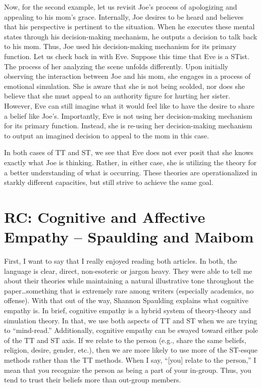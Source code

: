 \documentclass[11pt]{article}
\begin{document}
Now, for the second example, let us revisit Joe's process of apologizing and appealing to his mom's grace. Internally, Joe desires to be heard and believes that his perspective is pertinent to the situation. When he executes these mental states through his decision-making mechanism, he outputs a decision to talk back to his mom. Thus, Joe used his decision-making mechanism for its primary function. Let us check back in with Eve. Suppose this time that Eve is a STist. The process of her analyzing the scene unfolds differently. Upon initially observing the interaction between Joe and his mom, she engages in a process of emotional simulation. She is aware that she is not being scolded, nor does she believe that she must appeal to an authority figure for hurting her sister. However, Eve can still imagine what it would feel like to have the desire to share a belief like Joe's. Importantly, Eve is not using her decision-making mechanism for its primary function. Instead, she is re-using her decision-making mechanism to output an imagined decision to appeal to the mom in this case.

In both cases of TT and ST, we see that Eve does not ever posit that she knows exactly what Joe is thinking. Rather, in either case, she is utilizing the theory for a better understanding of what is occurring. These theories are operationalized in starkly different capacities, but still strive to achieve the same goal.

\section{RC: Cognitive and Affective Empathy -- Spaulding and Maibom}

First, I want to say that I really enjoyed reading both articles. In both, the language is clear, direct, non-esoteric or jargon heavy. They were able to tell me about their theories while maintaining a natural illustrative tone throughout the paper…something that is extremely rare among writers (especially academics, no offense). With that out of the way, Shannon Spaulding explains what cognitive empathy is. In brief, cognitive empathy is a hybrid system of theory-theory and simulation theory. In that, we use both aspects of TT and ST when we are trying to ``mind-read.'' Additionally, cognitive empathy can be swayed toward either pole of the TT and ST axis. If we relate to the person (e.g., share the same beliefs, religion, desire, gender, etc.), then we are more likely to use more of the ST-esque methods rather than the TT methods. When I say, ``[you] relate to the person,'' I mean that you recognize the person as being a part of your in-group. Thus, you tend to trust their beliefs more than out-group members. 
\end{document}
